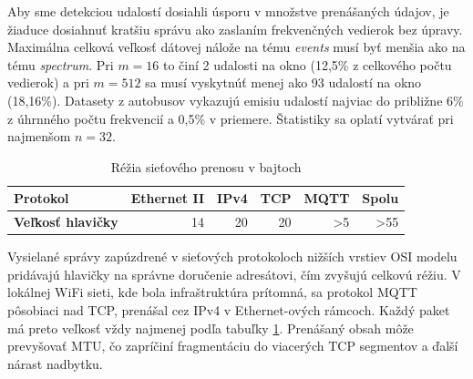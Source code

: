 Aby sme detekciou udalostí dosiahli úsporu v množstve prenášaných údajov, je žiaduce dosiahnuť kratšiu správu ako
zaslaním frekvenčných vedierok bez úpravy. Maximálna celková veľkosť dátovej nálože na tému \emph{events} musí byť menšia
ako na tému \emph{spectrum}. Pri $m = 16$ to činí 2 udalosti na okno (12,5\% z celkového počtu vedierok) a pri $m = 512$
sa musí vyskytnúť menej ako 93 udalostí na okno (18,16\%). Datasety z autobusov vykazujú emisiu udalostí najviac do
približne 6\% z úhrnného počtu frekvencií a 0,5\% v priemere. Štatistiky sa oplatí vytvárať pri najmenšom $n = 32$.

\begin{table}[h]
\def\arraystretch{1.25}
\centering
\begin{tabular}{|l|r|r|r|r|r|}
\hline
\textbf{Protokol}         & \textbf{Ethernet II} & \textbf{IPv4} & \textbf{TCP} & \textbf{MQTT}  & \textbf{Spolu}  \\ \hline
\textbf{Veľkosť hlavičky} & 14                   & 20            & 20           & \textgreater 5 & \textgreater 55 \\ \hline
\end{tabular}
\caption{Réžia sieťového prenosu v bajtoch}
\label{tab:net-overhead}
\end{table}

Vysielané správy zapúzdrené v sieťových protokoloch nižších vrstiev OSI modelu pridávajú
hlavičky na správne doručenie adresátovi, čím zvyšujú celkovú réžiu. V lokálnej WiFi sieti, kde bola infraštruktúra prítomná,
sa protokol MQTT pôsobiaci nad TCP, prenášal cez IPv4 v Ethernet-ových rámcoch. Každý paket má preto veľkosť vždy najmenej
podľa tabuľky \ref{tab:net-overhead}. Prenášaný obsah môže prevyšovať MTU, čo zapríčiní fragmentáciu do viacerých TCP segmentov
a ďalší nárast nadbytku.


